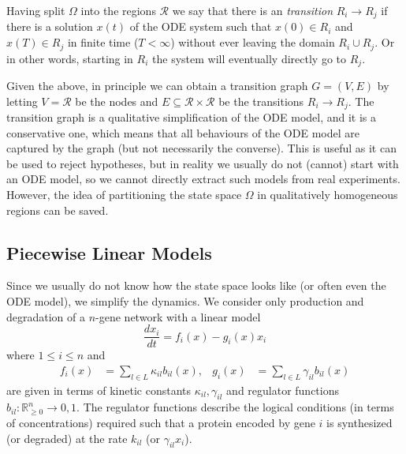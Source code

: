 \documentclass[a4paper]{article}
\theoremstyle{plain}
\theoremstyle{definition}
\theoremstyle{remark}
\begin{document}
Having split $\Omega$ into the regions $\mathcal{R}$ we say that there is an
\emph{transition} $R_i \to R_j$ if there is a solution $x(t)$ of the ODE
system such that $x(0) \in R_i$ and $x(T) \in R_j$ in finite time ($T <
\infty$) without ever leaving the domain $R_i \cup R_j$. Or in other words,
starting in $R_i$ the system will eventually directly go to $R_j$.

Given the above, in principle we can obtain a transition graph $G = (V,E)$ by
letting $V = \mathcal{R}$ be the nodes and $E \subseteq \mathcal{R} \times
\mathcal{R}$ be the transitions $R_i \to R_j$. The transition graph is a
qualitative simplification of the ODE model, and it is a conservative one,
which means that all behaviours of the ODE model are captured by the graph
(but not necessarily the converse). This is useful as it can be used to reject
hypotheses, but in reality we usually do not (cannot) start with an ODE model,
so we cannot directly extract such models from real experiments. However, the
idea of partitioning the state space $\Omega$ in qualitatively homogeneous
regions can be saved.

\subsection{Piecewise Linear Models}

Since we usually do not know how the state space looks like (or often even the
ODE model), we simplify the dynamics. We consider only production and
degradation of a $n$-gene network with a linear model
\begin{equation} \label{eqn:}
  \frac{dx_i}{dt} = f_i(x) - g_i(x) x_i
\end{equation}
where $1 \leq i \leq n$ and
\begin{align*}
  f_i(x) &= \sum_{l \in L} \kappa_{il} b_{il} (x), &
  g_i(x) &= \sum_{l \in L} \gamma_{il} b_{il} (x)
\end{align*}
are given in terms of kinetic constants $\kappa_{il},\gamma_{il}$ and
regulator functions $b_{il} : \mathbb{R}^n_{\geq 0} \to {0,1}$. The regulator
functions describe the logical conditions (in terms of concentrations)
required such that a protein encoded by gene $i$ is synthesized (or degraded)
at the rate $k_{il}$ (or $\gamma_{il} x_i$).
\end{document}
